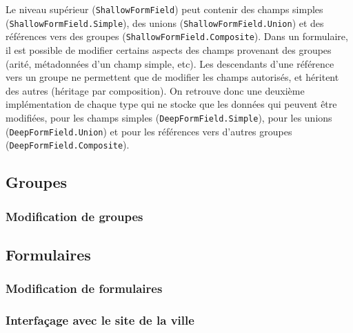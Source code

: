 Le niveau supérieur (\lstinline{ShallowFormField}) peut contenir des champs simples (\lstinline{ShallowFormField.Simple}), des unions (\lstinline{ShallowFormField.Union}) et des références vers des groupes (\lstinline{ShallowFormField.Composite}).
Dans un formulaire, il est possible de modifier certains aspects des champs provenant des groupes (arité, métadonnées d'un champ simple, etc).
Les descendants d'une référence vers un groupe ne permettent que de modifier les champs autorisés, et héritent des autres (héritage par composition).
On retrouve donc une deuxième implémentation de chaque type qui ne stocke que les données qui peuvent être modifiées, pour les champs simples (\lstinline{DeepFormField.Simple}), pour les unions (\lstinline{DeepFormField.Union}) et pour les références vers d'autres groupes (\lstinline{DeepFormField.Composite}).


\subsection{Groupes}\label{subsec:groupes}

\subsubsection{Modification de groupes}

\subsection{Formulaires}\label{subsec:formulaires}

\subsubsection{Modification de formulaires}

\subsubsection{Interfaçage avec le site de la ville}

